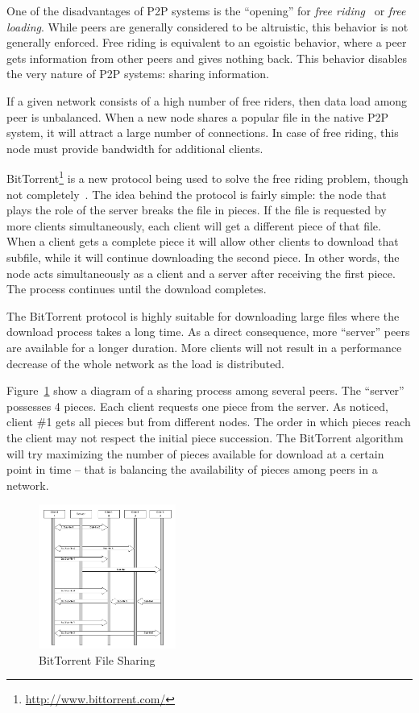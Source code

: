 One of the disadvantages of P2P systems is the ``opening'' for \textit{free
riding}~\cite{free-riding} or \textit{free loading}. While peers are generally
considered to be altruistic, this behavior is not generally enforced. Free
riding is equivalent to an egoistic behavior, where a peer gets information
from other peers and gives nothing back. This behavior disables the very
nature of P2P systems: sharing information.

If a given network consists of a high number of free riders, then data load
among peer is unbalanced. When a new node shares a popular file in the native
P2P system, it will attract a large number of connections. In case of free
riding, this node must provide bandwidth for additional clients.

BitTorrent\footnote{\url{http://www.bittorrent.com/}} is a new protocol being used to solve the free riding problem,
though not completely~\cite{free-riding}. The idea behind the protocol is
fairly simple: the node that plays the role of the server breaks the file in
pieces. If the file is requested by more clients simultaneously, each client
will get a different piece of that file. When a client gets a complete piece
it will allow other clients to download that subfile, while it will continue
downloading the second piece. In other words, the node acts simultaneously as
a client and a server after receiving the first piece. The process continues
until the download completes.

The BitTorrent protocol is highly suitable for downloading large files where
the download process takes a long time. As a direct consequence, more
``server'' peers are available for a longer duration. More clients will not
result in a performance decrease of the whole network as the load is
distributed.

Figure~\ref{fig:p2p-systems:bittorrent-sharing} show a diagram of a sharing
process among several peers. The ``server'' possesses 4 pieces. Each client
requests one piece from the server. As noticed, client \#1 gets all pieces
but from different nodes. The order in which pieces reach the client may not respect
the initial piece succession. The BitTorrent algorithm will try maximizing the
number of pieces available for download at a certain point in time -- that is
balancing the availability of pieces among peers in a network.

\begin{figure}
  \centering
  \includegraphics[width=0.4\textwidth]{src/img/p2p-systems/bittorrent-sharing}
  \caption{BitTorrent File Sharing}
  \label{fig:p2p-systems:bittorrent-sharing}
\end{figure}

